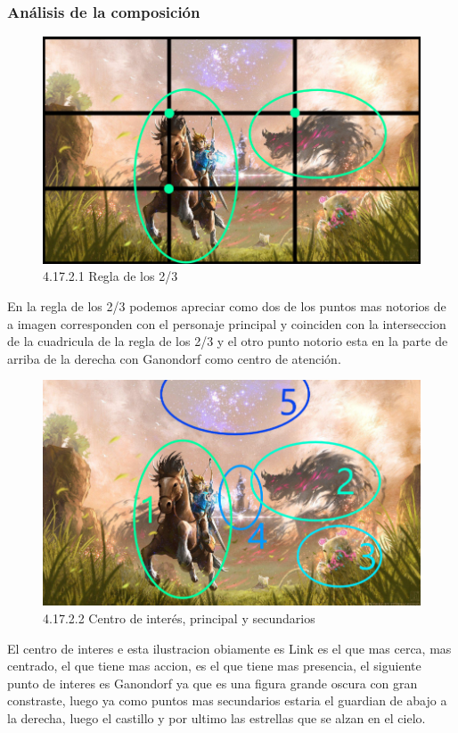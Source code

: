 \documentclass[12pt]{article}
\begin{document}
    \subsubsection{Análisis de la composición}

        
      \begin{figure}[H]
        \centering
        \includegraphics[width=\textwidth]{images/Saúl/Sección 17/EA_img17_2Composicion_1Regla2-3.png}
        \caption{\small 4.17.2.1 Regla de los 2/3}
      \end{figure}
      En la regla de los 2/3 podemos apreciar como dos de los puntos mas notorios de a imagen corresponden con el personaje principal y coinciden con la interseccion de la cuadricula de la regla de los 2/3 y el otro punto notorio esta en la parte de arriba de la derecha con Ganondorf como centro de atención.


      \begin{figure}[H]
        \centering
        \includegraphics[width=\textwidth]{images/Saúl/Sección 17/EA_img17_2Composicion_2PuntosInteres.png}
        \caption{\small 4.17.2.2 Centro de interés, principal y secundarios}
      \end{figure}
      El centro de interes e esta ilustracion obiamente es Link es el que mas cerca, mas centrado, el que tiene mas accion, es el que tiene mas presencia, el siguiente punto de interes es Ganondorf ya que es una figura grande oscura con gran constraste, luego ya como puntos mas secundarios estaria el guardian de abajo a la derecha, luego el castillo y por ultimo las estrellas que se alzan en el cielo.
\end{document}
